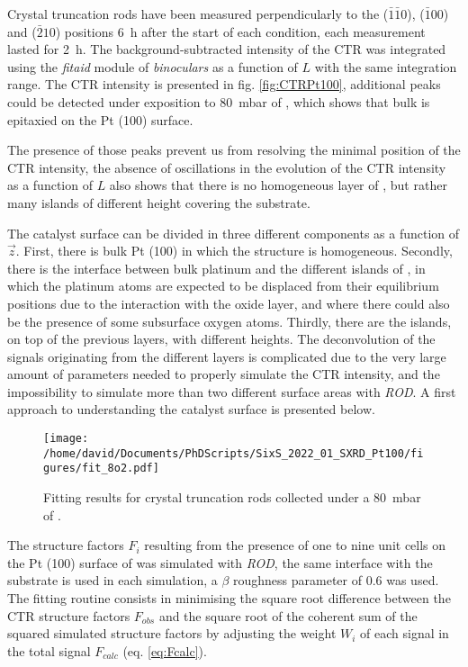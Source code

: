 Crystal truncation rods have been measured perpendicularly to the ($\bar{1}\bar{1}0$), ($\bar{1}00$) and ($\bar{2}10$) positions \qty{6}{\hour} after the start of each condition, each measurement lasted for \qty{2}{\hour}.
The background-subtracted intensity of the CTR was integrated using the \textit{fitaid} module of \textit{binoculars} as a function of $L$ with the same integration range.
The CTR intensity is presented in fig. \ref{fig:CTRPt100}, additional peaks could be detected under exposition to \qty{80}{\milli\bar} of , which shows that bulk  is epitaxied on the Pt (100) surface.

The presence of those peaks prevent us from resolving the minimal position of the CTR intensity, the absence of oscillations in the evolution of the CTR intensity as a function of $L$ also shows that there is no homogeneous layer of , but rather many islands of different height covering the substrate.

The catalyst surface can be divided in three different components as a function of $\vec{z}$.
First, there is bulk Pt (100) in which the structure is homogeneous.
Secondly, there is the interface between bulk platinum and the different islands of , in which the platinum atoms are expected to be displaced from their equilibrium positions due to the interaction with the oxide layer, and where there could also be the presence of some subsurface oxygen atoms.
Thirdly, there are the  islands, on top of the previous layers, with different heights.
The deconvolution of the signals originating from the different layers is complicated due to the very large amount of parameters needed to properly simulate the CTR intensity, and the impossibility to simulate more than two different surface areas with \textit{ROD}.
A first approach to understanding the catalyst surface is presented below.

\begin{figure}[!htb]
    \centering
    \texttt{[image: /home/david/Documents/PhDScripts/SixS\_2022\_01\_SXRD\_Pt100/figures/fit\_8o2.pdf]}
    \caption{
        Fitting results for crystal truncation rods collected under a \qty{80}{\milli\bar} of .
    }
    \label{fig:CTRFitHighOxygen}
\end{figure}

The structure factors $F_i$ resulting from the presence of one to nine unit cells on the Pt (100) surface of  was simulated with \textit{ROD}, the same interface with the substrate is used in each simulation, a $\beta$ roughness parameter of 0.6 was used.
The fitting routine consists in minimising the square root difference between the CTR structure factors $F_{obs}$ and the square root of the coherent sum of the squared simulated structure factors by adjusting the weight $W_i$ of each signal in the total signal $F_{calc}$ (eq. \ref{eq:Fcalc}).

